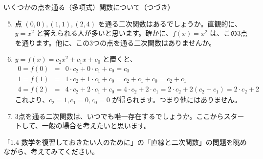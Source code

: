 \documentclass[10pt, dvipdfmx]{beamer}
\begin{document}
\begin{frame}{いくつかの点を通る（多項式）関数について（つづき）}
\begin{enumerate}
\setcounter{enumi}{4}
\item  点 \((0,0), (1,1), (2,4)\) を通る二次関数はあるでしょうか。直観的に、\(y = x^2\) と答えられる人が多いと思います。確かに、\(f(x) = x^2\) は、この3点を通ります。他に、この3つの点を通る二次関数はありませんか。
\item  \(y = f(x) = c_2x^2 + c_1x + c_0\) と置くと、 
\begin{eqnarray*} 0 = f(0)  & =  & 0\cdot c_2 + 0\cdot c_1 + c_0 = c_0\\ 1 = f(1)  & =  & 1\cdot c_2 + 1\cdot c_1 + c_0 = c_2 + c_1 + c_0 = c_2 + c_1\\ 4 = f(2)  & =  & 4\cdot c_2 + 2 \cdot c_1 + c_0 = 4\cdot c_2 + 2\cdot c_1 = 2\cdot c_2 + 2(c_2 + c_1) = 2\cdot c_2 + 2 \end{eqnarray*}
これより、\(c_2 = 1, c_1 = 0, c_0 = 0\) が得られます。つまり他にはありません。
\item  3点を通る二次関数は、いつでも唯一存在するでしょうか。ここからスタートして、一般の場合を考えたいと思います。
\end{enumerate}   

「1.4 数学を復習しておきたい人のために」の「直線と二次関数」の問題を眺めながら、考えてみてください。

\end{frame}
\end{document}
